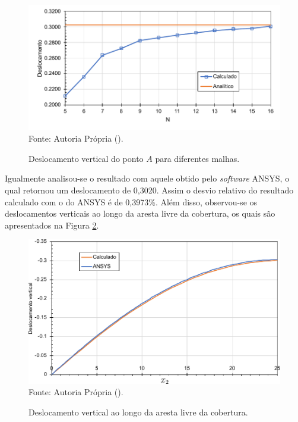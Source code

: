 \begin{figure}[h!]
    \centering
    \caption{Deslocamento vertical do ponto $A$ para diferentes malhas.}
    \includegraphics[width=0.75\linewidth]{Figuras/scordelis/static-sol.pdf}
    \\Fonte: Autoria Própria (\the\year).
    \label{fig:shell-static-sol}
\end{figure}

Igualmente analisou-se o resultado com aquele obtido pelo \textit{software} ANSYS, o qual retornou um deslocamento de 0,3020. Assim o desvio relativo do resultado calculado com o do ANSYS é de 0,3973\%. Além disso, observou-se os deslocamentos verticais ao longo da aresta livre da cobertura, os quais são apresentados na Figura \ref{fig:scordelis-graph}.

\begin{figure}[h!]
    \centering
    \caption{Deslocamento vertical ao longo da aresta livre da cobertura.}
    \includegraphics[width=0.7\linewidth]{Figuras/scordelis/deslocamento.pdf}
    \\Fonte: Autoria Própria (\the\year).
    \label{fig:scordelis-graph}
\end{figure}
